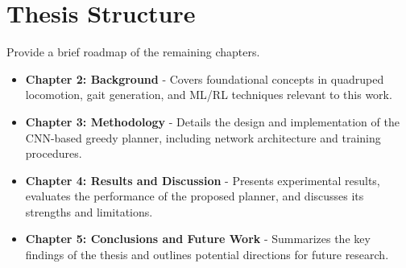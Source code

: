 \section{Thesis Structure}
\label{sec:introduction-thesis-structure}

\begin{outline}
  Provide a brief roadmap of the remaining chapters.
\end{outline}

\begin{itemize}
  \item \textbf{Chapter 2: Background} - Covers foundational concepts
    in quadruped locomotion, gait generation, and ML/RL
    techniques relevant to this work.
  \item \textbf{Chapter 3: Methodology} - Details the design and
    implementation of the CNN-based greedy planner, including network
    architecture and training procedures.
  \item \textbf{Chapter 4: Results and Discussion} - Presents
    experimental results, evaluates the performance of the proposed
    planner, and discusses its strengths and limitations.
  \item \textbf{Chapter 5: Conclusions and Future Work} - Summarizes
    the key findings of the thesis and outlines potential directions
    for future research.
\end{itemize}
